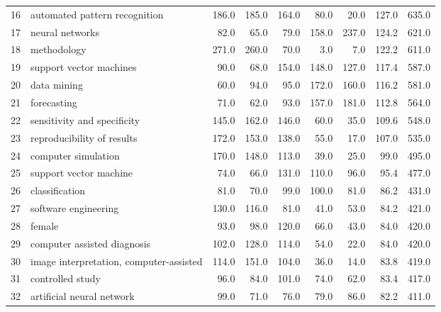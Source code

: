 \begin{tabular}{llrrrrrrr}
16 &            automated pattern recognition &   186.0 &   185.0 &   164.0 &    80.0 &    20.0 &   127.0 &   635.0 \\
17 &                          neural networks &    82.0 &    65.0 &    79.0 &   158.0 &   237.0 &   124.2 &   621.0 \\
18 &                              methodology &   271.0 &   260.0 &    70.0 &     3.0 &     7.0 &   122.2 &   611.0 \\
19 &                  support vector machines &    90.0 &    68.0 &   154.0 &   148.0 &   127.0 &   117.4 &   587.0 \\
20 &                              data mining &    60.0 &    94.0 &    95.0 &   172.0 &   160.0 &   116.2 &   581.0 \\
21 &                              forecasting &    71.0 &    62.0 &    93.0 &   157.0 &   181.0 &   112.8 &   564.0 \\
22 &              sensitivity and specificity &   145.0 &   162.0 &   146.0 &    60.0 &    35.0 &   109.6 &   548.0 \\
23 &               reproducibility of results &   172.0 &   153.0 &   138.0 &    55.0 &    17.0 &   107.0 &   535.0 \\
24 &                      computer simulation &   170.0 &   148.0 &   113.0 &    39.0 &    25.0 &    99.0 &   495.0 \\
25 &                   support vector machine &    74.0 &    66.0 &   131.0 &   110.0 &    96.0 &    95.4 &   477.0 \\
26 &                           classification &    81.0 &    70.0 &    99.0 &   100.0 &    81.0 &    86.2 &   431.0 \\
27 &                     software engineering &   130.0 &   116.0 &    81.0 &    41.0 &    53.0 &    84.2 &   421.0 \\
28 &                                   female &    93.0 &    98.0 &   120.0 &    66.0 &    43.0 &    84.0 &   420.0 \\
29 &              computer assisted diagnosis &   102.0 &   128.0 &   114.0 &    54.0 &    22.0 &    84.0 &   420.0 \\
30 &  image interpretation, computer-assisted &   114.0 &   151.0 &   104.0 &    36.0 &    14.0 &    83.8 &   419.0 \\
31 &                         controlled study &    96.0 &    84.0 &   101.0 &    74.0 &    62.0 &    83.4 &   417.0 \\
32 &                artificial neural network &    99.0 &    71.0 &    76.0 &    79.0 &    86.0 &    82.2 &   411.0 \\

\end{tabular}
